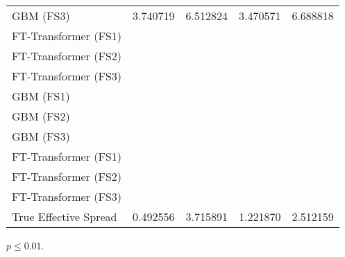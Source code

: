 \begin{threeparttable}
\begin{tabular}{@{}lSSSS@{}}
        \gls{GBM} (FS3)       & 3.740719                                                & 6.512824 \tnote{\dag}                                       & 3.470571      & 6.688818 \tnote{\dag}   \\
        FT-Transformer (FS1)  &                                                         & \tnote{\dag}                                                &               & \tnote{\dag}            \\
        FT-Transformer (FS2)  &                                                         & \tnote{\dag}                                                &               & \tnote{\dag}            \\
        FT-Transformer (FS3)  &                                                         & \tnote{\dag}                                                &               & \tnote{\dag}            \\ \midrule
        \gls{GBM} (FS1)       &                                                         & \tnote{\dag}                                                &               & \tnote{\dag}            \\
        \gls{GBM} (FS2)       &                                                         & \tnote{\dag}                                                &               & \tnote{\dag}            \\
        \gls{GBM} (FS3)       &                                                         & \tnote{\dag}                                                &               & \tnote{\dag}            \\
        FT-Transformer (FS1)  &                                                         & \tnote{\dag}                                                &               & \tnote{\dag}            \\
        FT-Transformer (FS2)  &                                                         & \tnote{\dag}                                                &               & \tnote{\dag}            \\
        FT-Transformer (FS3)  &                                                         & \tnote{\dag}                                                &               & \tnote{\dag}            \\ \midrule
        True Effective Spread & 0.492556                                                & 3.715891                                                 & 1.221870      & 2.512159             \\ \bottomrule
    \end{tabular}
    \begin{tablenotes}\footnotesize
        \item[\dag] $p \leq 0.01$.
    \end{tablenotes}
\end{threeparttable}